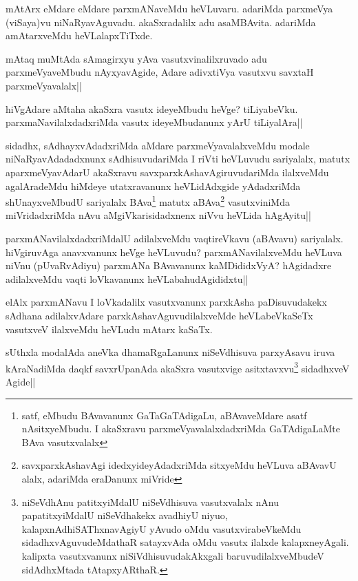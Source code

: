 \begin{artha}%
mAtArx eMdare eMdare parxmANaveMdu heVLuvaru. adariMda parxmeVya (viSaya)vu niNaRyavAguvadu. akaSxradalilx adu asaMBAvita. adariMda amAtarxveMdu heVLalapxTiTxde. 
\end{artha}

\begin{artha}
mAtaq muMtAda sAmagirxyu yAva vasutxvinalilxruvado adu parxmeVyaveMbudu nAyxyavAgide, Adare adivxtiVya vasutxvu savxtaH parxmeVyavalalx||
\end{artha}

\begin{artha}
hiVgAdare aMtaha akaSxra vasutx ideyeMbudu heVge? tiLiyabeVku. parxmaNavilalxdadxriMda vasutx ideyeMbudanunx yArU tiLiyalAra||
\end{artha}

\begin{artha}
sidadhx, sAdhayxvAdadxriMda aMdare parxmeVyavalalxveMdu modale niNaRyavAdadadxnunx sAdhisuvudariMda I riVti heVLuvudu sariyalalx, matutx aparxmeVyavAdarU akaSxravu savxparxkAshavAgiruvudariMda ilalxveMdu agalAradeMdu hiMdeye utatxravanunx heVLidAdxgide yAdadxriMda shUnayxveMbudU sariyalalx BAva\footnote[1]{satf, eMbudu BAvavanunx GaTaGaTAdigaLu, aBAvaveMdare asatf nAsitxyeMbudu. I akaSxravu parxmeVyavalalxdadxriMda GaTAdigaLaMte BAva vasutxvalalx} matutx aBAva\footnote[2]{savxparxkAshavAgi idedxyideyAdadxriMda sitxyeMdu heVLuva aBAvavU alalx, adariMda eraDanunx miVride} vasutxviniMda  miVridadxriMda nAvu aMgiVkarisidadxnenx niVvu heVLida hAgAyitu||
\end{artha}%

\begin{artha}
parxmANavilalxdadxriMdalU adilalxveMdu vaqtireVkavu (aBAvavu) sariyalalx. hiVgiruvAga anavxvanunx heVge heVLuvudu? parxmANavilalxveMdu heVLuva niVnu (pUvaRvAdiyu) parxmANa BAvavanunx kaMDididxVyA? hAgidadxre adilalxveMdu vaqti loVkavanunx heVLabahudAgididxtu||
\end{artha}

\begin{artha}
elAlx parxmANavu I loVkadalilx vasutxvanunx parxkAsha paDisuvudakekx sAdhana adilalxvAdare parxkAshavAguvudilalxveMde heVLabeVkaSeTx vasutxveV ilalxveMdu heVLudu mAtarx kaSaTx.
\end{artha}


\begin{artha}
sUthxla modalAda aneVka dhamaRgaLanunx niSeVdhisuva parxyAsavu iruva kAraNadiMda daqkf savxrUpanAda akaSxra vasutxvige asitxtavxvu\footnote[3]{niSeVdhAnu patitxyiMdalU niSeVdhisuva vasutxvalalx nAnu papatitxyiMdalU niSeVdhakekx avadhiyU niyuo, kalapxnAdhiSAThxnavAgiyU yAvudo oMdu vasutxvirabeVkeMdu sidadhxvAguvudeMdathaR satayxvAda oMdu vasutx ilalxde kalapxneyAgali. kalipxta vasutxvanunx niSiVdhisuvudakAkxgali baruvudilalxveMbudeV sidAdhxMtada tAtapxyARthaR.} sidadhxveV Agide||
\end{artha}

